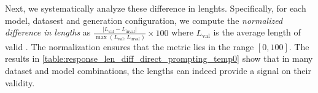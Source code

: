 Next, we systematically analyze these difference in \SCE lenghts. Specifically, for each model, datasest and \SCE generation configuration, we compute the \textit{normalized difference in lengths} as
$
\frac{| L_{\text{val}} - L_{\text{inval}} |}{\max(L_{\text{val}}, L_{\text{inval}})} \times 100 
$
where $L_{\text{val}}$ is the average length of valid \SCEs.
The normalization ensures that the metric lies in the range $[0, 100]$. The results in \autoref{table:response_len_diff_direct_prompting_temp0} show that in many dataset and model combinations, the \SCEs lengths can indeed provide a signal on their validity.






